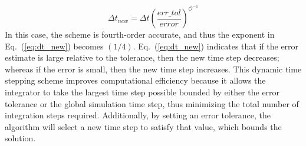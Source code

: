\begin{equation}\label{eq:dt_new}
\Delta t_{new}=\Delta t (\frac{err\_tol}{error})^{\mathcal{O}^{-1}}
\end{equation}
In this case, the scheme is fourth-order accurate, and thus the exponent in Eq.~(\ref{eq:dt_new}) becomes $(1/4)$. Eq.~(\ref{eq:dt_new}) indicates that if the error estimate is large relative to the tolerance, then the new time step decreases; whereas if the error is small, then the new time step increases. This dynamic time stepping scheme improves computational efficiency because it allows the integrator to take the largest time step possible bounded by either the error tolerance or the global simulation time step, thus minimizing the total number of integration steps required. Additionally, by setting an error tolerance, the algorithm will select a new time step to satisfy that value, which bounds the solution.

